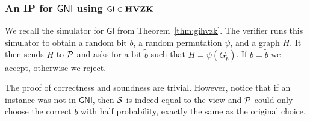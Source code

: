 \subsubsection{An IP for $\mathsf{GNI}$ using $\mathsf{GI}\in\mathbf{HVZK}$}

We recall the simulator for $\mathsf{GI}$ from Theorem~\ref{thm:gihvzk}. The verifier runs this simulator to obtain a random bit $b$, a random permutation $\psi$, and a graph $H$. It then sends $H$ to $\mathcal{P}$ and asks for a bit $\tilde{b}$ such that $H=\psi(G_{\tilde{b}})$. If $b=\tilde{b}$ we accept, otherwise we reject. 

The proof of correctness and soundness are trivial. However, notice that if an instance was not in $\mathsf{GNI}$, then $\mathcal{S}$ is indeed equal to the view and $\mathcal{P}$ could only choose the correct $\tilde{b}$ with half probability, exactly the same as the original choice.